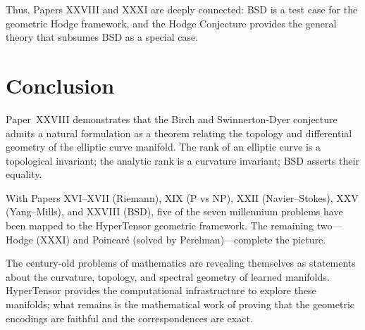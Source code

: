 \documentclass{article}
\begin{document}
Thus, Papers XXVIII and XXXI are deeply connected: BSD is a test case for
the geometric Hodge framework, and the Hodge Conjecture provides the
general theory that subsumes BSD as a special case.

\section{Conclusion}
\label{sec:conclusion}

Paper~XXVIII demonstrates that the Birch and Swinnerton-Dyer conjecture
admits a natural formulation as a theorem relating the topology and
differential geometry of the elliptic curve manifold.  The rank of an
elliptic curve is a topological invariant; the analytic rank is a
curvature invariant; BSD asserts their equality.

With Papers XVI--XVII (Riemann), XIX (P vs NP), XXII (Navier--Stokes),
XXV (Yang--Mills), and XXVIII (BSD), five of the seven millennium problems
have been mapped to the HyperTensor geometric framework.  The remaining
two---Hodge (XXXI) and Poincar\'{e} (solved by Perelman)---complete the
picture.

The century-old problems of mathematics are revealing themselves as
statements about the curvature, topology, and spectral geometry of
learned manifolds.  HyperTensor provides the computational infrastructure
to explore these manifolds; what remains is the mathematical work of
proving that the geometric encodings are faithful and the correspondences
are exact.
\end{document}
